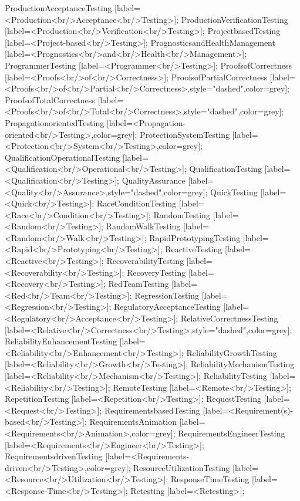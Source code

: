 \documentclass{article}
\begin{document}
{ProductionAcceptanceTesting [label=<Production<br/>Acceptance<br/>Testing>];
ProductionVerificationTesting [label=<Production<br/>Verification<br/>Testing>];
ProjectbasedTesting [label=<Project-based<br/>Testing>];
PrognosticsandHealthManagement [label=<Prognostics<br/>and<br/>Health<br/>Management>];
ProgrammerTesting [label=<Programmer<br/>Testing>];
ProofsofCorrectness [label=<Proofs<br/>of<br/>Correctness>];
ProofsofPartialCorrectness [label=<Proofs<br/>of<br/>Partial<br/>Correctness>,style="dashed",color=grey];
ProofsofTotalCorrectness [label=<Proofs<br/>of<br/>Total<br/>Correctness>,style="dashed",color=grey];
PropagationorientedTesting [label=<Propagation-oriented<br/>Testing>,color=grey];
ProtectionSystemTesting [label=<Protection<br/>System<br/>Testing>,color=grey];
QualificationOperationalTesting [label=<Qualification<br/>Operational<br/>Testing>];
QualificationTesting [label=<Qualification<br/>Testing>];
QualityAssurance [label=<Quality<br/>Assurance>,style="dashed",color=grey];
QuickTesting [label=<Quick<br/>Testing>];
RaceConditionTesting [label=<Race<br/>Condition<br/>Testing>];
RandomTesting [label=<Random<br/>Testing>];
RandomWalkTesting [label=<Random<br/>Walk<br/>Testing>];
RapidPrototypingTesting [label=<Rapid<br/>Prototyping<br/>Testing>];
ReactiveTesting [label=<Reactive<br/>Testing>];
RecoverabilityTesting [label=<Recoverability<br/>Testing>];
RecoveryTesting [label=<Recovery<br/>Testing>];
RedTeamTesting [label=<Red<br/>Team<br/>Testing>];
RegressionTesting [label=<Regression<br/>Testing>];
RegulatoryAcceptanceTesting [label=<Regulatory<br/>Acceptance<br/>Testing>];
RelativeCorrectnessTesting [label=<Relative<br/>Correctness<br/>Testing>,style="dashed",color=grey];
ReliabilityEnhancementTesting [label=<Reliability<br/>Enhancement<br/>Testing>];
ReliabilityGrowthTesting [label=<Reliability<br/>Growth<br/>Testing>];
ReliabilityMechanismTesting [label=<Reliability<br/>Mechanism<br/>Testing>];
ReliabilityTesting [label=<Reliability<br/>Testing>];
RemoteTesting [label=<Remote<br/>Testing>];
RepetitionTesting [label=<Repetition<br/>Testing>];
RequestTesting [label=<Request<br/>Testing>];
RequirementsbasedTesting [label=<Requirement(s)-based<br/>Testing>];
RequirementsAnimation [label=<Requirements<br/>Animation>,color=grey];
RequirementsEngineerTesting [label=<Requirements<br/>Engineer<br/>Testing>];
RequirementsdrivenTesting [label=<Requirements-driven<br/>Testing>,color=grey];
ResourceUtilizationTesting [label=<Resource<br/>Utilization<br/>Testing>];
ResponseTimeTesting [label=<Response-Time<br/>Testing>];
Retesting [label=<Retesting>];
}
\end{document}
